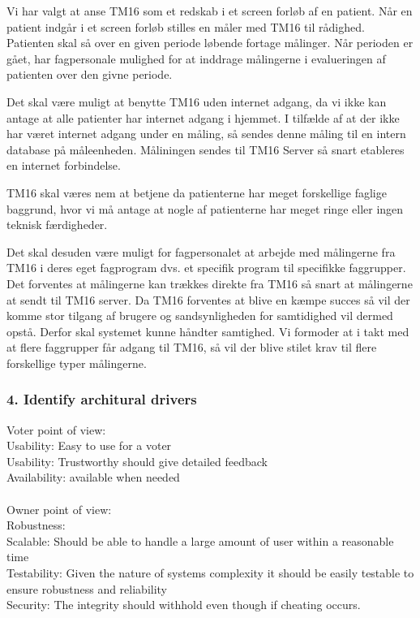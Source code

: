Vi har valgt at anse TM16 som et redskab i et screen forløb af en patient. Når en patient indgår i et screen forløb stilles en måler med TM16 til rådighed. Patienten skal så over en given periode løbende fortage målinger. Når perioden er gået, har fagpersonale mulighed for at inddrage målingerne i evalueringen af patienten over den givne periode. 


Det skal være muligt at benytte TM16 uden internet adgang, da vi ikke kan antage at alle patienter har internet adgang i hjemmet. I tilfælde af at der ikke har været internet adgang under en måling, så sendes denne måling til en intern database på måleenheden. Måliningen sendes til TM16 Server så snart etableres en internet forbindelse.



TM16 skal væres nem at betjene da patienterne har meget forskellige faglige baggrund, hvor vi må antage at nogle af patienterne har meget ringe eller ingen teknisk færdigheder. 

Det skal desuden være muligt for fagpersonalet at arbejde med målingerne fra TM16 i deres eget fagprogram dvs. et specifik program til specifikke faggrupper. Det forventes at målingerne kan trækkes direkte fra TM16 så snart at målingerne at sendt til TM16 server. Da TM16 forventes at blive en kæmpe succes så vil der komme stor tilgang af brugere og sandsynligheden for samtidighed vil dermed opstå. Derfor skal systemet kunne håndter samtighed. Vi formoder at i takt med at flere faggrupper får adgang til TM16, så vil der blive stilet krav til flere forskellige typer målingerne.

\subsubsection{4. Identify architural drivers}
Voter point of view: \\
Usability: Easy to use for a voter\\
Usability: Trustworthy should give detailed feedback\\
Availability: available when needed\\\\


\noindent
Owner point of view:\\

\noindent
Robustness:\\
Scalable: Should be able to handle a large amount of user within a reasonable time\\
Testability: Given the nature of systems complexity it should be easily testable to ensure robustness and reliability\\
Security: The integrity should withhold even though if cheating occurs.\\

